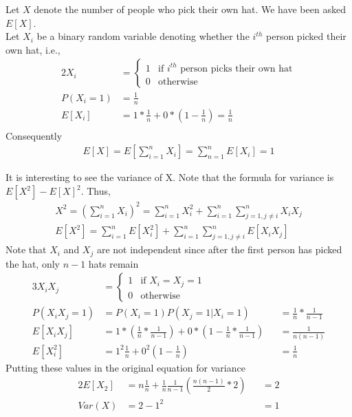 \documentclass[../../probability-notes.tex]{subfiles}
\begin{document}
        Let $X$ denote the number of people who pick their own hat. We have been asked $E[X]$.\\
        Let $X_{i}$ be a binary random variable denoting whether the $i^{th}$ person picked their own hat, i.e.,
        \begin{alignat*}{2}
            X_{i} &= \begin{cases} 1 &\mbox{if $i^{th}$ person picks their own hat}\\ 
                                    0 &\mbox{otherwise} \end{cases} \\
            P(X_{i} = 1) &= \frac{1}{n} \\
            E[X_{i}] &= 1 * \frac{1}{n} + 0 * (1 - \frac{1}{n}) = \frac{1}{n}\\
        \end{alignat*}
        Consequently
        \begin{align*}
            E[X] = E[\sum_{i=1}^{n} X_{i}] = \sum_{n=1}^{n}E[X_{i}] = 1
        \end{align*}

        It is interesting to see the variance of X. Note that the formula for variance is $E[X^{2}] - E[X]^{2}$. Thus,
        \begin{align*}
            X^{2} = (\sum_{i=1}^{n} X_{i})^{2} = \sum_{i=1}^{n} X_{i}^{2} + \sum_{i=1}^{n} \sum_{j=1, j\neq i}^{n} X_{i}X{_j} \\
            E[X^{2}] = \sum_{i=1}^{n}E[X_{i}^{2}] + \sum_{i=1}^{n} \sum_{j=1, j\neq i}^{n} E[X_{i}X{_j}] 
        \end{align*}
        Note that $X_{i}$ and $X_{j}$ are not independent since after the first person has picked the hat, only $n-1$ hats remain
        \begin{alignat*}{3}
            X_{i}X_{j} &= \begin{cases} 1 &\mbox{if $X_{i} = X_{j} = 1$}\\
                                       0 &\mbox{otherwise} \end{cases} \\
            P(X_{i}X_{j} = 1) &= P(X_{i} = 1) P(X_{j} = 1|X_{i} = 1) &&= \frac{1}{n} * \frac{1}{n-1}\\
            E[X_{i}X_{j}] &= 1 * (\frac{1}{n} * \frac{1}{n-1}) + 0 * (1 - \frac{1}{n} * \frac{1}{n-1}) &&= \frac{1}{n(n-1)}\\
            E[X_{i}^2] &= 1^{2} \frac{1}{n} + 0^{2} (1-\frac{1}{n}) &&= \frac{1}{n}
        \end{alignat*}
        Putting these values in the original equation for variance
        \begin{alignat*}{2}
            E[X_{2}] &= n \frac{1}{n} + \frac{1}{n} \frac{1}{n-1} (\frac{n(n-1)}{2} * 2) &&= 2\\
            Var(X) &= 2 - 1^{2} &&= 1
        \end{alignat*}
\end{document}
